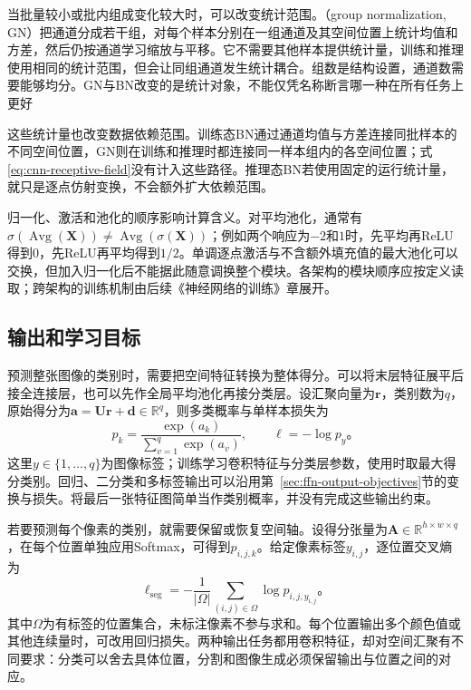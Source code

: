 当批量较小或批内组成变化较大时，可以改变统计范围。（group normalization, GN）把通道分成若干组，对每个样本分别在一组通道及其空间位置上统计均值和方差，然后仍按通道学习缩放与平移。它不需要其他样本提供统计量，训练和推理使用相同的统计范围，但会让同组通道发生统计耦合。组数是结构设置，通道数需要能够均分。GN与BN改变的是统计对象，不能仅凭名称断言哪一种在所有任务上更好

这些统计量也改变数据依赖范围。训练态BN通过通道均值与方差连接同批样本的不同空间位置，GN则在训练和推理时都连接同一样本组内的各空间位置；式\eqref{eq:cnn-receptive-field}没有计入这些路径。推理态BN若使用固定的运行统计量，就只是逐点仿射变换，不会额外扩大依赖范围。

归一化、激活和池化的顺序影响计算含义。对平均池化，通常有$\sigma(\operatorname{Avg}(\bm X))\neq\operatorname{Avg}(\sigma(\bm X))$；例如两个响应为$-2$和$1$时，先平均再ReLU得到$0$，先ReLU再平均得到$1/2$。单调逐点激活与不含额外填充值的最大池化可以交换，但加入归一化后不能据此随意调换整个模块。各架构的模块顺序应按定义读取；跨架构的训练机制由后续《神经网络的训练》章展开。

\subsection{输出和学习目标}
\label{sec:cnn-output-objectives}

预测整张图像的类别时，需要把空间特征转换为整体得分。可以将末层特征展平后接全连接层，也可以先作全局平均池化再接分类层。设汇聚向量为$\bm r$，类别数为$q$，原始得分为$\bm a=\bm U\bm r+\bm d\in\mathbb R^q$，则多类概率与单样本损失为
\begin{equation}
  p_k=\frac{\exp(a_k)}{\sum_{v=1}^{q}\exp(a_v)},\qquad
  \ell=-\log p_y\text{。}
  \label{eq:cnn-image-classification}
\end{equation}
这里$y\in\{1,\ldots,q\}$为图像标签；训练学习卷积特征与分类层参数，使用时取最大得分类别。回归、二分类和多标签输出可以沿用第~\ref{sec:ffn-output-objectives}节的变换与损失。将最后一张特征图简单当作类别概率，并没有完成这些输出约束。

若要预测每个像素的类别，就需要保留或恢复空间轴。设得分张量为$\bm A\in\mathbb R^{h\times w\times q}$，在每个位置单独应用Softmax，可得到$p_{i,j,k}$。给定像素标签$y_{i,j}$，逐位置交叉熵为
\begin{equation}
  \ell_{\mathrm{seg}}=-\frac1{|\Omega|}
    \sum_{(i,j)\in\Omega}\log p_{i,j,y_{i,j}}\text{。}
  \label{eq:cnn-segmentation-loss}
\end{equation}
其中$\Omega$为有标签的位置集合，未标注像素不参与求和。每个位置输出多个颜色值或其他连续量时，可改用回归损失。两种输出任务都用卷积特征，却对空间汇聚有不同要求：分类可以舍去具体位置，分割和图像生成必须保留输出与位置之间的对应。

